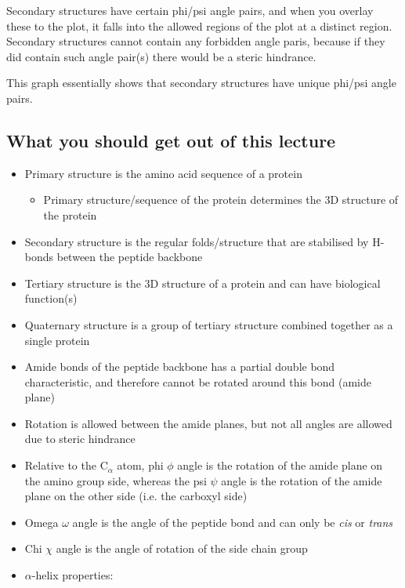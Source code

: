 Secondary structures have certain phi/psi angle pairs, and when you overlay these to the plot, it falls into the allowed regions of the plot at a distinct region.
Secondary structures cannot contain any forbidden angle paris, because if they did contain such angle pair(s) there would be a steric hindrance.

This graph essentially shows that secondary structures have unique phi/psi angle pairs.


\subsection*{What you should get out of this lecture}

\begin{itemize}
	\item Primary structure is the amino acid sequence of a protein
		\begin{itemize}
			\item Primary structure/sequence of the protein determines the 3D structure of the protein
		\end{itemize}
	\item Secondary structure is the regular folds/structure that are stabilised by H-bonds between the peptide backbone
	\item Tertiary structure is the 3D structure of a protein and can have biological function(s)
	\item Quaternary structure is a group of tertiary structure combined together as a single protein
	\item Amide bonds of the peptide backbone has a partial double bond characteristic, and therefore cannot be rotated around this bond (amide plane)
	\item Rotation is allowed between the amide planes, but not all angles are allowed due to steric hindrance
	\item Relative to the C$_{\alpha}$ atom, phi $\phi$ angle is the rotation of the amide plane on the amino group side, whereas the psi $\psi$ angle is the rotation of the amide plane on the other side (i.e. the carboxyl side)
	\item Omega $\omega$ angle is the angle of the peptide bond and can only be \textit{cis} or \textit{trans}
	\item Chi $\chi$ angle is the angle of rotation of the side chain group
	\item $\alpha$-helix properties:

\end{itemize}
